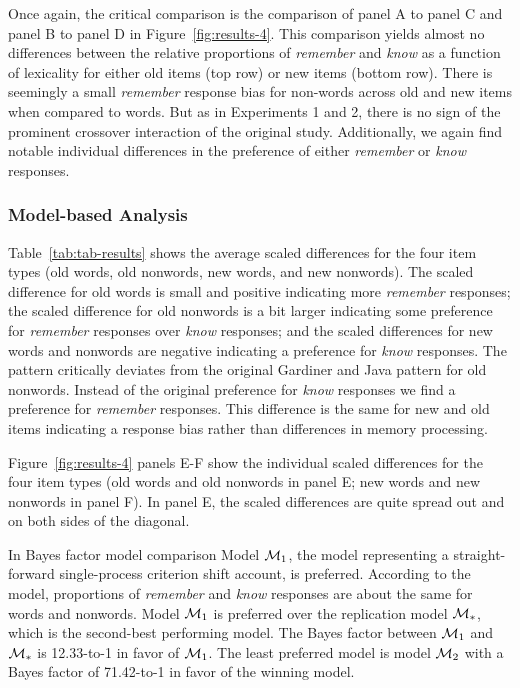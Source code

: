 \documentclass[english,,man,floatsintext]{apa6}
\begin{document}
Once again, the critical comparison is the comparison of panel A to panel C and panel B to panel D in Figure~\ref{fig:results-4}. This comparison yields almost no differences between the relative proportions of \emph{remember} and \emph{know} as a function of lexicality for either old items (top row) or new items (bottom row). There is seemingly a small \emph{remember} response bias for non-words across old and new items when compared to words. But as in Experiments 1 and 2, there is no sign of the prominent crossover interaction of the original study. Additionally, we again find notable individual differences in the preference of either \emph{remember} or \emph{know} responses.

\hypertarget{model-based-analysis-3}{%
\subsubsection{Model-based Analysis}\label{model-based-analysis-3}}

Table~\ref{tab:tab-results} shows the average scaled differences for the four item types (old words, old nonwords, new words, and new nonwords). The scaled difference for old words is small and positive indicating more \emph{remember} responses; the scaled difference for old nonwords is a bit larger indicating some preference for \emph{remember} responses over \emph{know} responses; and the scaled differences for new words and nonwords are negative indicating a preference for \emph{know} responses. The pattern critically deviates from the original Gardiner and Java pattern for old nonwords. Instead of the original preference for \emph{know} responses we find a preference for \emph{remember} responses. This difference is the same for new and old items indicating a response bias rather than differences in memory processing.

Figure~\ref{fig:results-4} panels E-F show the individual scaled differences for the four item types (old words and old nonwords in panel E; new words and new nonwords in panel F). In panel E, the scaled differences are quite spread out and on both sides of the diagonal.

In Bayes factor model comparison Model \({\cal M}_{1}\), the model representing a straight-forward single-process criterion shift account, is preferred. According to the model, proportions of \emph{remember} and \emph{know} responses are about the same for words and nonwords. Model \({\cal M}_{1}\) is preferred over the replication model \({\cal M}_{*}\), which is the second-best performing model. The Bayes factor between \({\cal M}_{1}\) and \({\cal M}_{*}\) is 12.33-to-1 in favor of \({\cal M}_{1}\). The least preferred model is model \({\cal M}_2\) with a Bayes factor of 71.42-to-1 in favor of the winning model.
\end{document}
